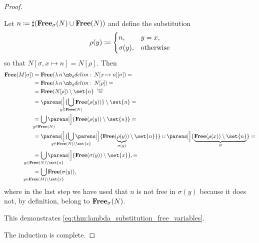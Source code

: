 \begin{proof}
\begin{itemize}
\begin{itemize}
      Let \( n \coloneqq \sharp(\op*{Free}_\sigma(N) \cup \op*{Free}(N)) \) and define the substitution
      \begin{equation*}
        \rho(y) \coloneqq \begin{cases}
          n,         &y = x, \\
          \sigma(y), &\T{otherwise}
        \end{cases}
      \end{equation*}
      so that \( N[\sigma, x \mapsto n] = N[\rho] \). Then
      \begin{align*}
        \op*{Free}(M[\sigma])
        &=
        \op*{Free}(\qabs n N[x \mapsto n][\sigma])
        = \\ &=
        \op*{Free}(\qabs n N[\rho])
        = \\ &=
        \op*{Free}(N[\rho]) \setminus \set{ n }
        \reloset {\T{ind.}} = \\ &=
        \parens[\Big]{ \bigcup_{\mathclap{y \in \op*{Free}(N)}} \op*{Free}(\rho(y)) } \setminus \set{ n }
        = \\ &=
        \bigcup_{\mathclap{y \in \op*{Free}(N)}} \parens[\Big]{ \op*{Free}(\rho(y)) \setminus \set{ n } }
        = \\ &=
        \parens[\Big]{ \bigcup_{\mathclap{y \in \op*{Free}(N) \setminus \set{ x }}} \parens[\Big]{ \op*{Free}(\underbrace{\rho(y)}_{\sigma(y)}) \setminus \set{ n } } } \cup \parens[\Big]{ \underbrace{\op*{Free}(\rho(x)) \setminus \set{ n }}_\varnothing }
        = \\ &=
        \bigcup_{\mathclap{y \in \op*{Free}(N) \setminus \set{ x }}} \parens[\Big]{ \op*{Free}(\sigma(y)) \setminus \set{ x } },
        = \\ &=
        \bigcup_{\mathclap{y \in \op*{Free}(M) \setminus \set{ x }}} \op*{Free}(\sigma(y)),
      \end{align*}
      where in the last step we have used that \( n \) is not free in \( \sigma(y) \) because it does not, by definition, belong to \( \op*{Free}_\sigma(N) \).

      This demonstrates \eqref{eq:thm:lambda_substitution_free_variables}.
    \end{itemize}
  \end{itemize}

  The induction is complete.
\end{proof}

